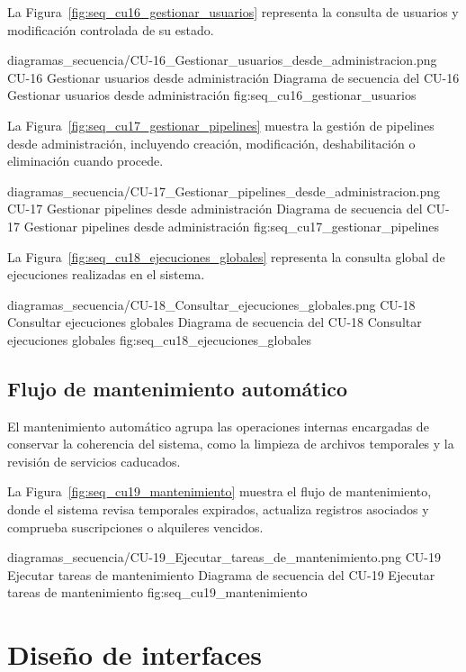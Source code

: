 La Figura~\ref{fig:seq_cu16_gestionar_usuarios} representa la consulta de usuarios y modificación controlada de su estado.

\diagramaSecuencia
{diagramas_secuencia/CU-16_Gestionar_usuarios_desde_administracion.png}
{CU-16 Gestionar usuarios desde administración}
{Diagrama de secuencia del CU-16 Gestionar usuarios desde administración}
{fig:seq_cu16_gestionar_usuarios}

La Figura~\ref{fig:seq_cu17_gestionar_pipelines} muestra la gestión de pipelines desde administración, incluyendo creación, modificación, deshabilitación o eliminación cuando procede.

\diagramaSecuenciaGrande
{diagramas_secuencia/CU-17_Gestionar_pipelines_desde_administracion.png}
{CU-17 Gestionar pipelines desde administración}
{Diagrama de secuencia del CU-17 Gestionar pipelines desde administración}
{fig:seq_cu17_gestionar_pipelines}

La Figura~\ref{fig:seq_cu18_ejecuciones_globales} representa la consulta global de ejecuciones realizadas en el sistema.

\diagramaSecuencia
{diagramas_secuencia/CU-18_Consultar_ejecuciones_globales.png}
{CU-18 Consultar ejecuciones globales}
{Diagrama de secuencia del CU-18 Consultar ejecuciones globales}
{fig:seq_cu18_ejecuciones_globales}

\subsection{Flujo de mantenimiento automático}

El mantenimiento automático agrupa las operaciones internas encargadas de conservar la coherencia del sistema, como la limpieza de archivos temporales y la revisión de servicios caducados.

La Figura~\ref{fig:seq_cu19_mantenimiento} muestra el flujo de mantenimiento, donde el sistema revisa temporales expirados, actualiza registros asociados y comprueba suscripciones o alquileres vencidos.

\diagramaSecuencia
{diagramas_secuencia/CU-19_Ejecutar_tareas_de_mantenimiento.png}
{CU-19 Ejecutar tareas de mantenimiento}
{Diagrama de secuencia del CU-19 Ejecutar tareas de mantenimiento}
{fig:seq_cu19_mantenimiento}

\FloatBarrier

\section{Diseño de interfaces}

